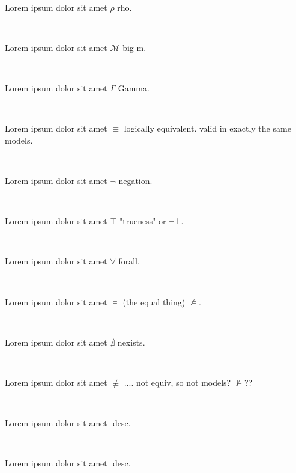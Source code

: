 \documentclass[12pt]{article}
\begin{document}
\centerline{~}

Lorem ipsum dolor sit amet $ \rho $ rho.

\centerline{~}

Lorem ipsum dolor sit amet $ \mathcal{M} $ big m.

\centerline{~}

Lorem ipsum dolor sit amet $ \Gamma $ Gamma.

\centerline{~}

Lorem ipsum dolor sit amet $ \equiv $ logically equivalent. valid in exactly the same models.

\centerline{~}

Lorem ipsum dolor sit amet $ \neg $ negation.

\centerline{~}

Lorem ipsum dolor sit amet $ \top $ "trueness" or $ \neg \bot $.

\centerline{~}

Lorem ipsum dolor sit amet $ \forall $ forall.

\centerline{~}

Lorem ipsum dolor sit amet $ \models $ (the equal thing) $ \nvDash $.

\centerline{~}

Lorem ipsum dolor sit amet $ \nexists $ nexists.

\centerline{~}

Lorem ipsum dolor sit amet $ \not\equiv $ .... not equiv, so not models? $ \not\models $??

\centerline{~}

Lorem ipsum dolor sit amet $  $ desc.

\centerline{~}

Lorem ipsum dolor sit amet $  $ desc.

\centerline{~}
\end{document}
